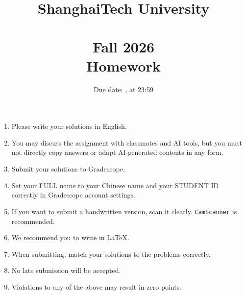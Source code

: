\documentclass[11pt, addpoints, a4paper]{exam}
\title{
    \vspace{25pt}
    \LARGE ShanghaiTech University \\
    \bigskip
    \textbf{\CourseName} \\
    \textbf{Fall 2026}   \\
    \bigskip
    Homework \HomeworkNO
}
\author{}
\date{\large Due date: \DueDate, at 23:59}
\newcommand{\ttt}{\texttt}
\begin{document}
\maketitle

\vspace{50pt}

\begin{enumerate}
    \item Please write your solutions in English.
    \item You may discuss the assignment with classmates and AI tools, but you must not directly copy answers or adapt AI-generated contents in any form.
    \item Submit your solutions to Gradescope.
    \item Set your FULL name to your Chinese name and your STUDENT ID correctly in Gradescope account settings.
    \item If you want to submit a handwritten version, scan it clearly. \ttt{CamScanner} is recommended.
    \item We recommend you to write in \LaTeX.
    \item When submitting, match your solutions to the problems correctly.
    \item No late submission will be accepted.
    \item Violations to any of the above may result in zero points.
\end{enumerate}


\begin{questions}
\setlength{\parskip}{0.6\baselineskip}

\newpage


\newpage


\newpage


\newpage


\newpage


\newpage
\end{questions}
\end{document}
